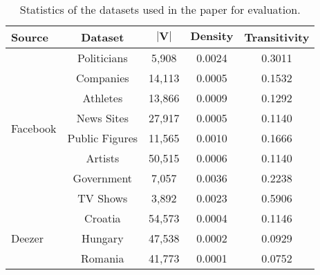 {\small\begin{table}[H]
\centering
\begin{tabular}{lcccc}
\hline
 \textbf{Source}& \textbf{Dataset}& $|\textbf{V}|$ & $\textbf{Density}$ & \textbf{Transitivity}\\ \hline
\multirow{8}{*}{Facebook} &  Politicians &   5,908  &0.0024 &  0.3011      \\
&  Companies &   14,113  & 0.0005    &     0.1532           \\
&  Athletes &   13,866  & 0.0009  &   0.1292      \\
&  News Sites &   27,917  & 0.0005  &   0.1140       \\
&  Public Figures &   11,565  & 0.0010    & 0.1666           \\
&  Artists &   50,515  &  0.0006   &    0.1140      \\
&  Government &   7,057  & 0.0036    &0.2238          \\
&  TV Shows &   3,892  & 0.0023    & 0.5906        \\\hline
 &Croatia &   54,573  &      0.0004   & 0.1146      \\
Deezer & Hungary &   47,538  & 0.0002    &      0.0929    \\
 & Romania &   41,773 &  0.0001   &       0.0752  \\
 \hline
\end{tabular}
\caption{Statistics of the datasets used in the paper for evaluation.}
\label{fig:stats}
	\vspace{-5mm}
\end{table}}
